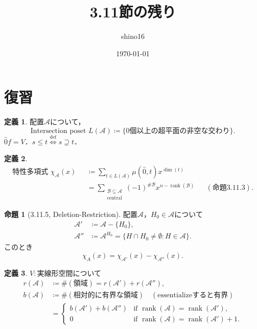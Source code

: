 \documentclass[xelatex,ja=standard,a4paper,14pt,everyparhook=compat]{bxjsarticle}
\title{3.11節の残り}
\author{shino16}
\date{\today}
\newcommand{\mcA}{\mathcal{A}}
\newcommand{\mcB}{\mathcal{B}}
\DeclareMathOperator{\rank}{rank}
\theoremstyle{definition}
\newtheorem*{definition}{定義}
\newtheorem*{proposition}{命題}
\begin{document}
\maketitle

\tableofcontents

\newpage

\setcounter{section}{-1}
\section{復習}

\begin{definition}
    配置$\mcA$について， \begin{equation*}
        \text{Intersection poset $L(\mcA) \coloneqq \{\text{$0$個以上の超平面の非空な交わり}\}$}.
    \end{equation*}
    $\hat 0f = V$．$s \leq t \overset{\mathrm{def}}{\iff} s \supseteq t$．
\end{definition}

\begin{definition}
    \begin{align*}
        \text{特性多項式 $\chi_\mcA(x)$ }
         & \coloneqq \sum_{t \in L(\mcA)} \mu(\hat0, t) x^{\dim(t)} \\
         & = \sum_{\substack{\mcB \subseteq \mcA                    \\ \text{central}}} (-1)^{\#\mcB} x^{n - \rank(\mcB)} && (\text{命題3.11.3}).
    \end{align*}
\end{definition}

\begin{proposition}[3.11.5, Deletion-Restriction]
    配置$\mcA$，$H_0 \in \mcA$について \begin{align*}
        \mcA'  & \coloneqq \mcA - \{H_0\},                                          \\
        \mcA'' & \coloneqq \mcA^{H_0} = \{H \cap H_0 \neq \emptyset : H \in \mcA\}.
    \end{align*}
    このとき \begin{equation*}
        \chi_A(x) = \chi_{\mcA'}(x) - \chi_{\mcA''}(x).
    \end{equation*}
\end{proposition}

\begin{definition}
    $V : \text{実線形空間}$について \begin{align*}
        r(\mcA) & \coloneqq \#(\text{領域}) = r(\mcA') + r(\mcA''),                             \\
        b(\mcA) & \coloneqq \#(\text{相対的に有界な領域}) \quad (\text{essentializeすると有界}) \\
                & = \begin{cases}
            b(\mcA') + b(\mcA'') & \text{if $\rank(\mcA) = \rank(\mcA')$,}     \\
            0                    & \text{if $\rank(\mcA) = \rank(\mcA') + 1$.}
        \end{cases}
    \end{align*}
\end{definition}
\end{document}
